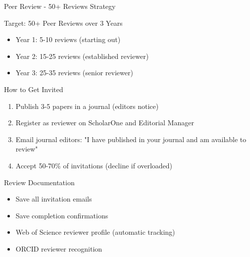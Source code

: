 \documentclass[11pt]{beamer}
\begin{document}
	\begin{frame}{Peer Review - 50+ Reviews Strategy}
		\scriptsize
		\begin{block}{Target: 50+ Peer Reviews over 3 Years}
			\begin{itemize}
				\item Year 1: 5-10 reviews (starting out)
				\item Year 2: 15-25 reviews (established reviewer)
				\item Year 3: 25-35 reviews (senior reviewer)
			\end{itemize}
		\end{block}
		\begin{block}{How to Get Invited}
			\begin{enumerate}
				\item Publish 3-5 papers in a journal (editors notice)
				\item Register as reviewer on ScholarOne and Editorial Manager
				\item Email journal editors: "I have published in your journal and am available to review"
				\item Accept 50-70\% of invitations (decline if overloaded)
			\end{enumerate}
		\end{block}
		\begin{block}{Review Documentation}
			\begin{itemize}
				\item Save all invitation emails
				\item Save completion confirmations
				\item Web of Science reviewer profile (automatic tracking)
				\item ORCID reviewer recognition
			\end{itemize}
		\end{block}
	\end{frame}
	
\end{document}
